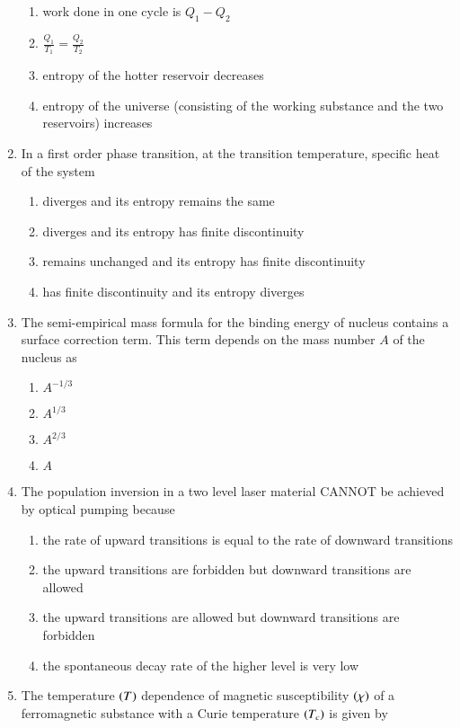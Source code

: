 \documentclass[journal]{IEEEtran}
\begin{document}
\begin{enumerate}
\begin{enumerate}
    \item work done in one cycle is $Q_1 - Q_2$
    \item $\frac{Q_1}{T_1} = \frac{Q_2}{T_2}$
    \item entropy of the hotter reservoir decreases
    \item entropy of the universe (consisting of the working substance and the two reservoirs) increases
\end{enumerate}
\item In a first order phase transition, at the transition temperature, specific heat of the system
\begin{enumerate}
    \item diverges and its entropy remains the same
    \item diverges and its entropy has finite discontinuity
    \item remains unchanged and its entropy has finite discontinuity
    \item has finite discontinuity and its entropy diverges
    \end{enumerate}
\item The semi-empirical mass formula for the binding energy of nucleus contains a surface correction term. This term depends on the mass number $A$ of the nucleus as
\begin{enumerate}
    \item $A^{-1/3}$
    \item $A^{1/3}$
    \item $A^{2/3}$
    \item $A$
\end{enumerate}
\item The population inversion in a two level laser material CANNOT be achieved by optical pumping because
\begin{enumerate}
    \item the rate of upward transitions is equal to the rate of downward transitions
    \item the upward transitions are forbidden but downward transitions are allowed
    \item the upward transitions are allowed but downward transitions are forbidden
    \item the spontaneous decay rate of the higher level is very low
\end{enumerate}
\item The temperature $\left(T\right)$ dependence of magnetic susceptibility $\left(\chi\right)$ of a ferromagnetic substance with a Curie temperature $\left(T_c\right)$ is given by

\end{enumerate}
\end{document}
